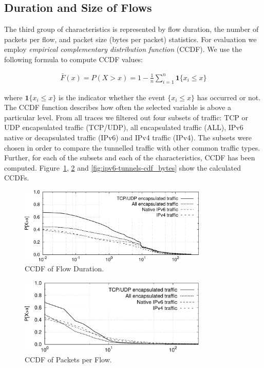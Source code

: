 \subsection{Duration and Size of Flows}
The third group of characteristics is represented by flow duration, the number of packets per flow, and packet size (bytes per packet) statistics. For evaluation we employ \textit{empirical complementary distribution function} (CCDF). We use the following formula to compute CCDF values:

\begin{align}
    \bar{F}(x)= P(X>x)=1-\frac{1}{n}\sum^{n}_{i=1}\mathbf{1}\{x_{i}\leq x\}
\end{align}

where $\mathbf{1}\{x_{i}\leq x\}$ is the indicator whether the event $\{x_{i}\leq x\}$ has occurred or not. The CCDF function describes how often the selected variable is above a particular level. From all traces we filtered out four subsets of traffic: TCP or UDP encapsulated traffic (TCP/UDP), all encapsulated traffic (ALL), IPv6 native or decapsulated traffic (IPv6) and IPv4 traffic (IPv4). The subsets were chosen in order to compare the tunnelled traffic with other common traffic types. Further, for each of the subsets and each of the characteristics, CCDF has been computed. Figure~\ref{fig:ipv6-tunnels-cdf_duration}, \ref{fig:ipv6-tunnels-cdf_packets} and \ref{fig:ipv6-tunnels-cdf_bytes} show the calculated CCDFs.

\begin{figure}[!tb]
     \centering
     \includegraphics[width=0.8\textwidth]{figures/paper-tunnels/cdf_functions/cdf_duration}
     \caption{CCDF of Flow Duration.}
     \label{fig:ipv6-tunnels-cdf_duration}
\end{figure}

\begin{figure}[!tb]
     \centering
     \includegraphics[width=0.8\textwidth]{figures/paper-tunnels/cdf_functions/cdf_packets}
     \caption{CCDF of Packets per Flow.}
     \label{fig:ipv6-tunnels-cdf_packets}
\end{figure}

